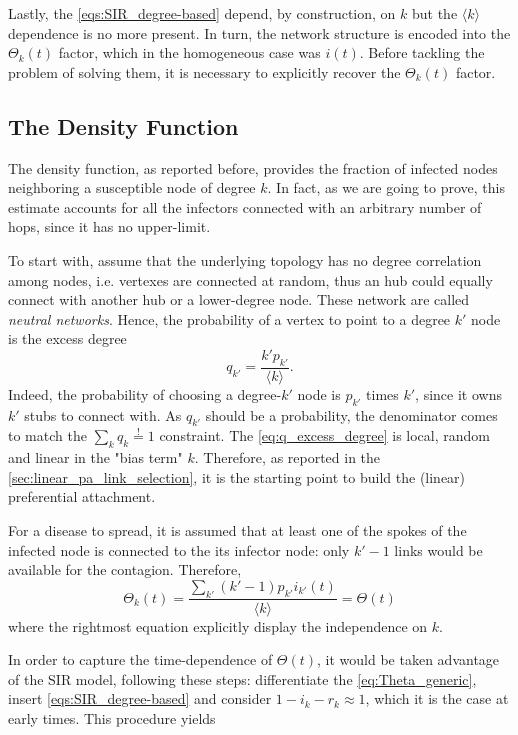 \documentclass[a4paper,10pt,twoside]{book} %
\theoremstyle{definition}
\begin{document}
Lastly, the \autoref{eqs:SIR_degree-based} depend, by construction, on $k$ but the $\langle k \rangle$ dependence is no more present. In turn, the network structure is encoded into the $\Theta_k(t)$ factor, which in the homogeneous case was $i(t)$.
Before tackling the problem of solving them, it is necessary to explicitly recover the $\Theta_k(t)$ factor.

\subsection*{The Density Function}
The density function, as reported before, provides the fraction of infected nodes neighboring a susceptible node of degree $k$. In fact, as we are going to prove, this estimate accounts for all the infectors connected with an arbitrary number of hops, since it has no upper-limit. 

To start with, assume that the underlying topology has no degree correlation among nodes, i.e. vertexes are connected at random, thus an hub could equally connect with another hub or a lower-degree node. These network are called \textit{neutral networks}. Hence, the probability of a vertex to point to a degree $k'$ node is the excess degree 
\begin{equation}
	q_{k'} = \frac{k' p_{k'}}{\langle k \rangle}
	\label{eq:q_excess_degree}
	.
\end{equation}
Indeed, the probability of choosing a degree-$k'$ node is $p_{k'}$ times $k'$, since it owns $k'$ stubs to connect with. As $q_{k'}$ should be a probability, the denominator comes to match the $\sum_k q_k \stackrel{!}{=} 1$ constraint.
The \autoref{eq:q_excess_degree} is local, random and linear in the "bias term" $k$. Therefore, as reported in the \autoref{sec:linear_pa_link_selection}, it is the starting point to build the (linear) preferential attachment.

For a disease to spread, it is assumed that at least one of the spokes of the infected node is connected to the its infector node: only $k'-1$ links would be available for the contagion.
Therefore,
\begin{equation}
	\Theta_k(t) = \frac{\sum_{k'} (k'-1)p_{k'}i_{k'}(t)}{\langle k \rangle} = \Theta(t)
	\label{eq:Theta_generic}
\end{equation}
where the rightmost equation explicitly display the independence on $k$.

In order to capture the time-dependence of $\Theta(t)$, it would be taken advantage of the SIR model, following these steps: differentiate the \autoref{eq:Theta_generic}, insert \autoref{eqs:SIR_degree-based} and consider $1-i_k-r_k \approx 1$, which it is the case at early times. This procedure yields \cite{barabasi::2016networkbook}
\end{document}
